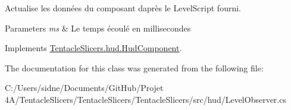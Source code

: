 Actualise les données du composant d\textquotesingle{}après le Level\+Script fourni. 


\begin{DoxyParams}{Parameters}
{\em ms} & Le temps écoulé en millisecondes \\
\hline
\end{DoxyParams}


Implements \hyperlink{class_tentacle_slicers_1_1hud_1_1_hud_component}{Tentacle\+Slicers.\+hud.\+Hud\+Component}.



The documentation for this class was generated from the following file\+:\begin{DoxyCompactItemize}
\item 
C\+:/\+Users/sidne/\+Documents/\+Git\+Hub/\+Projet 4\+A/\+Tentacle\+Slicers/\+Tentacle\+Slicers/\+Tentacle\+Slicers/src/hud/Level\+Observer.\+cs\end{DoxyCompactItemize}
